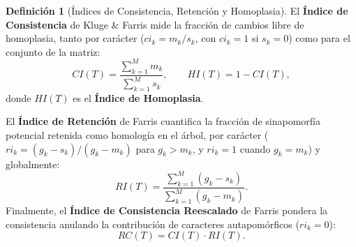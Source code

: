\documentclass[11pt,a4paper]{article}
\theoremstyle{definition}
\newtheorem{definicion}{Definición}[section]
\theoremstyle{remark}
\begin{document}
\begin{definicion}[Índices de Consistencia, Retención y Homoplasia]
El \textbf{Índice de Consistencia} de Kluge \& Farris \cite{kluge1969} mide la fracción de cambios libre de homoplasia, tanto por carácter ($ci_k = m_k / s_k$, con $ci_k = 1$ si $s_k = 0$) como para el conjunto de la matriz:
\begin{equation}
\label{eq:ci}
CI(T) = \frac{\sum_{k=1}^M m_k}{\sum_{k=1}^M s_k}, \qquad HI(T) = 1 - CI(T),
\end{equation}
donde $HI(T)$ es el \textbf{Índice de Homoplasia}.

El \textbf{Índice de Retención} de Farris \cite{farris1989} cuantifica la fracción de sinapomorfía potencial retenida como homología en el árbol, por carácter ($ri_k = (g_k - s_k)/(g_k - m_k)$ para $g_k > m_k$, y $ri_k = 1$ cuando $g_k = m_k$) y globalmente:
\begin{equation}
\label{eq:ri}
RI(T) = \frac{\sum_{k=1}^M (g_k - s_k)}{\sum_{k=1}^M (g_k - m_k)}.
\end{equation}
Finalmente, el \textbf{Índice de Consistencia Reescalado} de Farris \cite{farris1989} pondera la consistencia anulando la contribución de caracteres autapomórficos ($ri_k = 0$):
\begin{equation}
\label{eq:rc}
RC(T) = CI(T) \cdot RI(T).
\end{equation}
\end{definicion}
\end{document}
